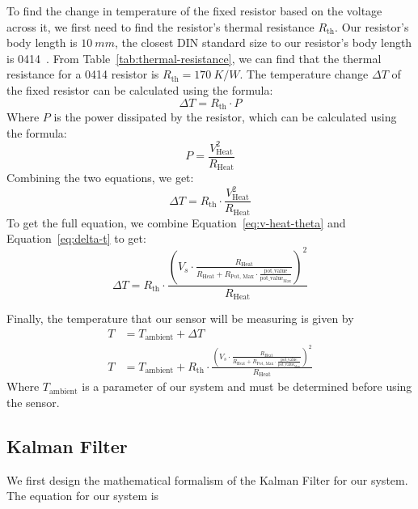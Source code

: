 \documentclass[12pt,a4paper]{article}
\begin{document}
To find the change in temperature of the fixed resistor based on the voltage across it, we first need to find the resistor's thermal resistance $R_{\text{th}}$. Our resistor's body length is $\SI{10}{mm}$, the closest DIN standard size to our resistor's body length is 0414~\cite[pp.~13]{din}. From Table~\ref{tab:thermal-resistance}, we can find that the thermal resistance for a 0414 resistor is $R_{\text{th}} = \SI{170}{K/W}$. The temperature change $\Delta T$ of the fixed resistor can be calculated using the formula:
\begin{equation*}
    \Delta T = R_{\text{th}} \cdot P
\end{equation*}
Where $P$ is the power dissipated by the resistor, which can be calculated using the formula:
\begin{equation*}
    P = \frac{V_{\text{Heat}}^2}{R_{\text{Heat}}}
\end{equation*}
Combining the two equations, we get:
\begin{equation}
    \Delta T = R_{\text{th}} \cdot \frac{V_{\text{Heat}}^2}{R_{\text{Heat}}}
    \label{eq:delta-t}
\end{equation}
To get the full equation, we combine Equation~\ref{eq:v-heat-theta} and Equation~\ref{eq:delta-t} to get:
\begin{equation}
    \Delta T = R_{\text{th}} \cdot \frac{\left(V_s \cdot \frac{R_{\text{Heat}}}{R_{\text{Heat}} + R_{\text{Pot, Max}} \cdot \frac{\text{pot\_value}}{\text{pot\_value}_{\text{Max}}}}\right)^2}{R_{\text{Heat}}}
    \label{eq:full-delta-t}
\end{equation}

Finally, the temperature that our sensor will be measuring is given by
\begin{align}
    T &= T_{\text{ambient}} + \Delta T \nonumber \\
    T &= T_{\text{ambient}} + R_{\text{th}} \cdot \frac{\left(V_s \cdot \frac{R_{\text{Heat}}}{R_{\text{Heat}} + R_{\text{Pot, Max}} \cdot \frac{\text{pot\_value}}{\text{pot\_value}_{\text{Max}}}}\right)^2}{R_{\text{Heat}}} \label{eq:final-temp}
\end{align}
Where $T_{\text{ambient}}$ is a parameter of our system and must be determined before using the sensor.


\label{sec:math-model}

\subsection{Kalman Filter}
We first design the mathematical formalism of the Kalman Filter for our system. The equation for our system is
\end{document}
